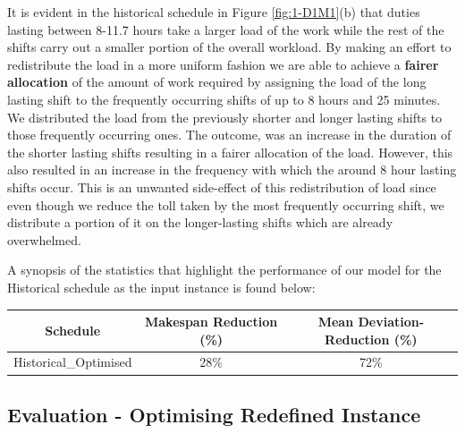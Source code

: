 \vspace{\baselineskip}
\noindent
It is evident in the historical schedule in Figure \ref{fig:1-D1M1}(b) that duties lasting between 8-11.7 hours take a larger load of the work while the rest of the shifts carry out a smaller portion of the overall workload. By making an effort to redistribute the load in a more uniform fashion we are able to achieve a \textbf{fairer allocation} of the amount of work required by assigning the load of the long lasting shift to the frequently occurring shifts of up to 8 hours and 25 minutes. We distributed the load from the previously shorter and longer lasting shifts to those frequently occurring ones. The outcome, was an increase in the duration of the shorter lasting shifts resulting in a fairer allocation of the load. However, this also resulted in an increase in the frequency with which the around 8 hour lasting shifts occur. This is an unwanted side-effect of this redistribution of load since even though we reduce the toll taken by the most frequently occurring shift, we distribute a portion of it on the longer-lasting shifts which are already overwhelmed. 

\vspace{\baselineskip}
\noindent
A synopsis of the statistics that highlight the performance of our model for the Historical schedule as the input instance is found below:

\begin{table}[h]
\small
    \centering 
\begin{tabular}{c|c|c}
        \textbf{Schedule} & \textbf{Makespan Reduction (\%)} & Mean Deviation-\textbf{Reduction (\%)} \\
        \hline
         Historical\_Optimised & 28\% & 72\% \\
\end{tabular}
\end{table}





\subsection*{Evaluation - Optimising Redefined Instance}

